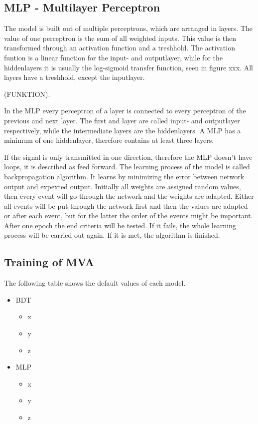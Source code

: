 \documentclass[11pt]{scrartcl}
\begin{document}
	\subsection{MLP - Multilayer Perceptron}
	
	The model is built out of multiple perceptrons, which are arranged in layers. The value of one perceptron is the sum of all weighted inputs. This value is then transformed through an activation function and a treshhold. The activation funtion is a linear function for the input- and outputlayer, while for the hiddenlayers it is usually the log-sigmoid transfer function, seen in figure xxx. All layers have a treshhold, except the inputlayer. 
	
	(FUNKTION).
	
	In the MLP every perceptron of a layer is connected to every perceptron of the previous and next layer. The first and layer are called input- and outputlayer respectively, while the intermediate layers are the hiddenlayers. A MLP has a minimum of one hiddenlayer, therefore contains at least three layers.
	
	If the signal is only transmitted in one direction, therefore the MLP doesn't have loops, it is described as feed forward. The learning process of the model is called backpropagation algorithm. It learns by minimizing the error between network output and expexted output. Initially all weights are assigned random values, then every event will go through the network and the weights are adapted. Either all events will be put through the network first and then the values are adapted or after each event, but for the latter the order of the events might be important. After one epoch the end criteria will be tested. If it fails, the whole learning process will be carried out again. If it is met, the algorithm is finished.
	
	\subsection{Training of MVA}
	
	The following table shows the default values of each model.
	
		\begin{itemize}
  			\item BDT
  					\begin{itemize}
  					\item x
  					\item y
  					\item z
  					\end{itemize}
  		  	\item MLP
  					\begin{itemize}
  					\item x
  					\item y
  					\item z
  					\end{itemize}		
		\end{itemize}
	
\end{document}
